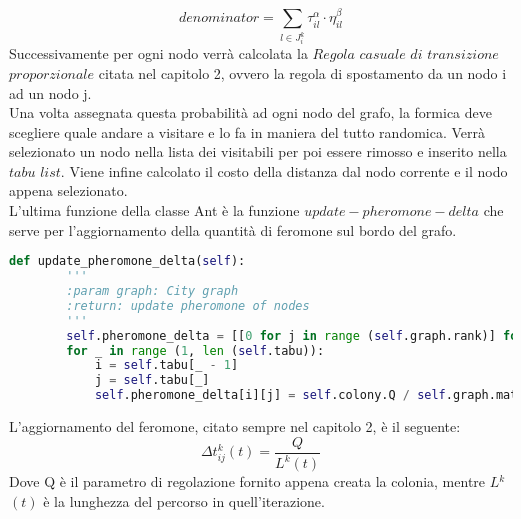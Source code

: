 \documentclass[a4paper,12pt]{report}
\begin{document}
\begin{equation}
    denominator=\sum_{l \in J_i^k} \tau_{il}^\alpha \cdot \eta_{il}^\beta 
\end{equation}
Successivamente per ogni nodo verrà calcolata la $Regola$ $casuale$ $di$ $transizione$ $proporzionale$ citata nel capitolo 2, ovvero la regola di spostamento da un nodo i ad un nodo j.\\
Una volta assegnata questa probabilità ad ogni nodo del grafo, la formica deve scegliere quale andare a visitare e lo fa in maniera del tutto randomica. Verrà selezionato un nodo nella lista dei visitabili per poi essere rimosso e inserito nella $tabu$ $list$.
Viene infine calcolato il costo della distanza dal nodo corrente e il nodo appena selezionato. \\

L'ultima funzione della classe Ant è la funzione $update-pheromone-delta$ che serve per l'aggiornamento della quantità di feromone sul bordo del grafo.
\begin{lstlisting}[language=Python]
    def update_pheromone_delta(self):
        '''
        :param graph: City graph
        :return: update pheromone of nodes
        '''
        self.pheromone_delta = [[0 for j in range (self.graph.rank)] for i in range (self.graph.rank)]
        for _ in range (1, len (self.tabu)):
            i = self.tabu[_ - 1]
            j = self.tabu[_]
            self.pheromone_delta[i][j] = self.colony.Q / self.graph.matrix[i][j]
\end{lstlisting}

L'aggiornamento del feromone, citato sempre nel capitolo 2, è il seguente:
\begin{equation}
    \Delta t_{ij}^k (t)  = \frac{Q}{L^k(t)}
\end{equation}
Dove Q è il parametro di regolazione fornito appena creata la colonia, mentre $L$$^k$$(t)$ è la lunghezza del percorso in quell'iterazione.\\
\end{document}
